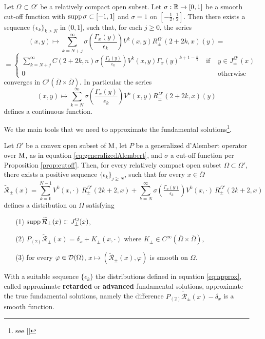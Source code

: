 \begin{prop}
	Let $\Omega\subset\Omega'$ be a relatively compact open subset. Let $\sigma:{\mathbb R}\to[0,1]$ be a smooth cut-off function with $\text{supp}\,\sigma\subset[-1,1]$ and $\sigma=1$ on $[-\frac12,\frac12]$. Then there exists a sequence $\{\epsilon_k\}_{k\geq N}$ in $(0,1]$, such that, for each $j\geq 0$, the series
	\[		(x,y)\mapsto\sum_{k=N+j}^{\infty}\sigma\left(\frac{\Gamma_x(y)}{\epsilon_k}\right)V^k(x,y)R_\pm^{\Omega'}(2+2k,x)(y)=\]
	\begin{equation}
		=\begin{cases}
		\sum_{k=N+j}^{\infty} C(2+2k,n)\sigma\left(\frac{\Gamma_x(y)}{\epsilon_k}\right)V^k(x,y)\Gamma_x(y)^{k+1-\frac{n}2}\quad\text{if }&y\in J_\pm^{\Omega'}(x)\\
		0 &\text{otherwise}
		\end{cases}
	\end{equation}
	converges in $C^j(\overline{\Omega}\times\overline{\Omega})$. In particular the series
	\[	(x,y)\mapsto\sum_{k=N}^{\infty}\sigma\left(\frac{\Gamma_x(y)}{\epsilon_k}\right)V^k(x,y)R_\pm^{\Omega'}(2+2k,x)(y)		\]
	defines a continuous function.
	\label{prop:cutoff}
\end{prop}

\noindent We the main tools that we need to approximate the fundamental solutions\footnote{see [\citealp[Prop 2.2.10]{bar2}]}.


\begin{theorem}
	Let $\Omega'$ be a convex open subset of $\mathrm{M}$, let $P$ be a generalized d'Alembert operator over $\mathrm{M}$, as in equation \eqref{eq:generalizedAlembert}, and $\sigma$ a cut-off function per Proposition \ref{prop:cutoff}. Then, for every relatively compact open subset $\Omega\subset\Omega'$, there exists a positive sequence $\{\epsilon_k\}_{j\geq N}$, such that for every $x\in\overline{\Omega}$
	\begin{equation}
		\widetilde{\mathcal{R}}_\pm(x)=\sum_{k=0}^{N-1} V^k(x,\cdot)\, R_\pm^{\Omega'}(2k+2,x)	+\sum_{k=N}^{\infty}\sigma\left(\tfrac{\Gamma_x(y)}{\epsilon_k}\right) V^k(x,\cdot)\, R_\pm^{\Omega'}(2k+2,x)
		\label{eq:approx}
	\end{equation}
	defines a distribution on $\Omega$ satisfying
	\begin{enumerate}
		\item[(1)] $\text{supp}\,\widetilde{\mathcal{R}}_\pm(x)\subset J_\pm^\Omega(x)$,
		\item[(2)] $P_{(2)}\widetilde{\mathcal{R}}_\pm(x)=\delta_x+K_\pm(x,\cdot)$ where $K_\pm\in C^\infty(\overline{\Omega}\times\overline{\Omega})$,
		\item[(3)] for every $\varphi\in\mathcal{D}(\Omega)$, $x\mapsto\left(\widetilde{\mathcal{R}}_\pm(x),\varphi\right)$ is smooth on $\Omega$.
	\end{enumerate}
\label{th:approx}
\end{theorem}
\noindent With a suitable sequence $\{\epsilon_k\}$ the distributions defined in equation \eqref{eq:approx}, called approximate \textbf{retarded} or \textbf{advanced} fundamental solutions, approximate the true fundamental solutions, namely the difference $P_{(2)}\widetilde{\mathcal{R}}_\pm(x)-\delta_x$ is a smooth function.


